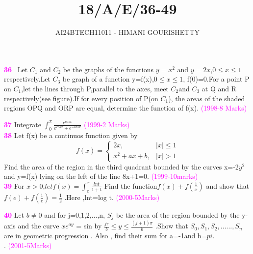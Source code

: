 \documentclass[journal,12pt,twocolumn]{IEEEtran}
\theoremstyle{remark}
\begin{document}

\vspace{3cm}

\title{18/A/E/36-49}
\author{AI24BTECH11011 - HIMANI GOURISHETTY}
\maketitle
\newpage
\bigskip

\renewcommand{\thefigure}{\theenumi}
\renewcommand{\thetable}{\theenumi}


\textbf{\textcolor{magenta}{36}}
\ Let $C_1$ and $C_2$ be the graphs of the functions $y=x^2$ and $y=2x$,$0\le x\le1$ respectively.Let $C_3$ be graph of a function y=f(x),$0\le x \le 1$, f(0)=0.For a point P on $C_1$,let the lines through P,parallel to the axes, meet $C_2$and $C_3$ at Q and R respectively(see figure).If for every position of P(on $C_1$), the areas of the shaded regions OPQ and ORP are equal, determine the function of f(x).
    \hfill{\textcolor{magenta}{(1998-8 Marks)}}
        
	        
		    
		    \textbf{\textcolor{magenta}{37}}
		       Integrate $\int_{0}^{\pi}\frac{e^{cosx}}{e^{cosx}+e^{-cosx}}$
		                \hfill{\textcolor{magenta}{(1999-2 Marks)}}\\
				         
					  \textbf{\textcolor{magenta}{38}}
					    Let f(x) be a continuos function given by \\
					         \[
						      f(x)=
						           \begin{cases}
							            2x,&|x|\le1\\
								             x^2+ax+b,&|x|>1
									          \end{cases}
										       \]
										        Find the area of the region in the third quadrant bounded by the curves x=-2$y^2$ and y=f(x) lying on the left of the line 8x+1=0.  
											    \hfill{\textcolor{magenta}{(1999-10marks)}}\\
											        
												\textbf{\textcolor{magenta}{39}}
												For $x > 0 $,$
												let f(x)=\int_{e}^{x}\frac{lnt}{1+t}$
												Find the function$ f(x) + f(\frac{1}{x})$
												and show that $f(e)+f(\frac{1}{e})=
												\frac{1}{2}$ .Here ,lnt=log t.
												  \hfill{\textcolor{magenta}{(2000-5Marks)}}
												    

												      \textbf{\textcolor{magenta}{40}}
												        Let $b\neq0$ and for j=0,1,2,...,n, $S_j$ be the area of the region bounded by the y-axis and the curve $xe^{ay}$ = sin by $\frac{jr}{b} \le y \le \frac{(j+1)\pi}{b}$ .Show that  $S_0,S_1,S_2,......,S_n$ are in geometric progression . Also , find their sum for a=-1and b=$pi$.\\.
													  \hfill{\textcolor{magenta}{(2001-5Marks)}}
													    
\end{document}
